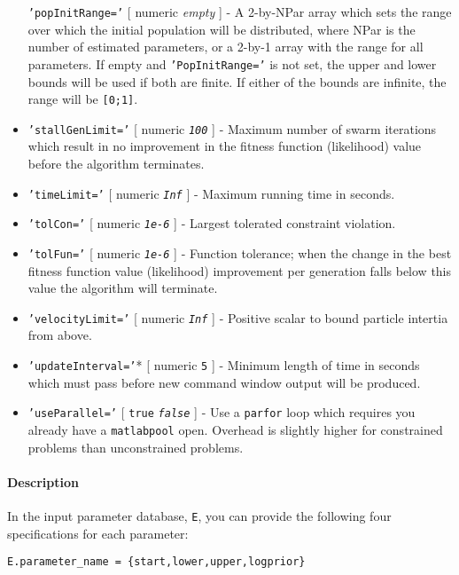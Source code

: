 \begin{itemize}
  \texttt{'popInitRange='} {[} numeric \textbar{} \emph{empty} {]} - A
  2-by-NPar array which sets the range over which the initial population
  will be distributed, where NPar is the number of estimated parameters,
  or a 2-by-1 array with the range for all parameters. If empty and
  \texttt{'PopInitRange='} is not set, the upper and lower bounds will
  be used if both are finite. If either of the bounds are infinite, the
  range will be \texttt{{[}0;1{]}}.
\item
  \texttt{'stallGenLimit='} {[} numeric \textbar{} \emph{\texttt{100}}
  {]} - Maximum number of swarm iterations which result in no
  improvement in the fitness function (likelihood) value before the
  algorithm terminates.
\item
  \texttt{'timeLimit='} {[} numeric \textbar{} \emph{\texttt{Inf}} {]} -
  Maximum running time in seconds.
\item
  \texttt{'tolCon='} {[} numeric \textbar{} \emph{\texttt{1e-6}} {]} -
  Largest tolerated constraint violation.
\item
  \texttt{'tolFun='} {[} numeric \textbar{} \emph{\texttt{1e-6}} {]} -
  Function tolerance; when the change in the best fitness function value
  (likelihood) improvement per generation falls below this value the
  algorithm will terminate.
\item
  \texttt{'velocityLimit='} {[} numeric \textbar{} \emph{\texttt{Inf}}
  {]} - Positive scalar to bound particle intertia from above.
\item
  \texttt{'updateInterval='}* {[} numeric \textbar{} \texttt{5} {]} -
  Minimum length of time in seconds which must pass before new command
  window output will be produced.
\item
  \texttt{'useParallel='} {[} \texttt{true} \textbar{}
  \emph{\texttt{false}} {]} - Use a \texttt{parfor} loop which requires
  you already have a \texttt{matlabpool} open. Overhead is slightly
  higher for constrained problems than unconstrained problems.
\end{itemize}

\paragraph{Description}\label{description}

In the input parameter database, \texttt{E}, you can provide the
following four specifications for each parameter:

\begin{verbatim}
E.parameter_name = {start,lower,upper,logprior}
\end{verbatim}

